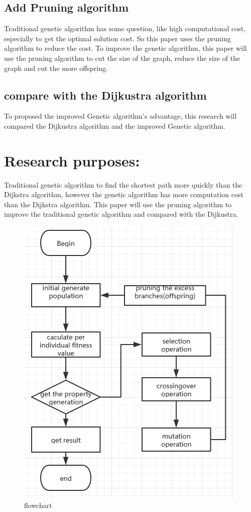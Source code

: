 \documentclass[12pt]{article}
\begin{document}
\subsection{Add Pruning algorithm}
Traditional genetic algorithm has some question, like high computational cost, especially to get the optimal solution cost. So this paper uses the pruning algorithm to reduce the cost. To improve the genetic algorithm, this paper will use the pruning algorithm to cut the size of the graph, reduce the size of the graph and cut the more offspring.
\subsection{compare with the Dijkustra algorithm}
To proposed the improved Genetic algorithm's advantage, this research will compared the Dijkustra algorithm and the improved Genetic algorithm.

\section{Research purposes:}
Traditional genetic algorithm to find the shortest path more quickly than the Dijkstra algorithm, however the genetic algorithm has more computation cost than the Dijkstra algorithm\cite{Osaba2013}. This paper will use the pruning algorithm to improve the traditional genetic algorithm and compared with the Dijkustra.


\begin{figure}[h]
	\centering
	\includegraphics{flowchart1}
	\caption{flowchart}
\end{figure}
	\small
	
	

%
%
\end{document}
